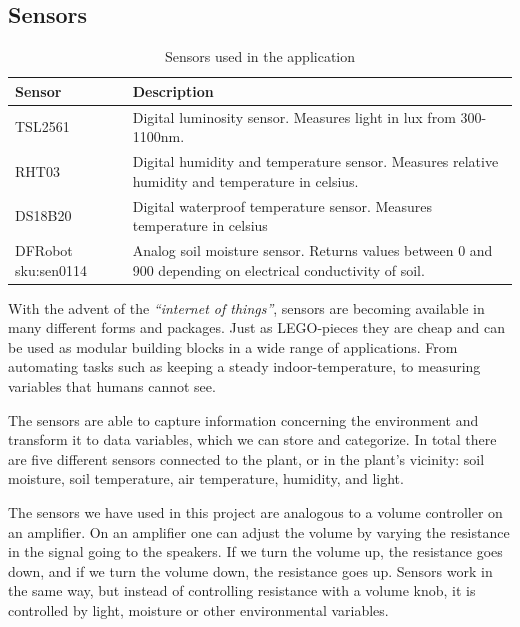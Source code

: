 \subsection{Sensors}

\def\arraystretch{1.8}
\begin{table}
    \begin{tabular}{@{}lp{250pt}@{}}\toprule
    Sensor               & Description \\ \midrule                                                                                                  
    TSL2561              & Digital luminosity sensor. Measures light in lux from 300-1100nm.                                            \\ 
    RHT03                & Digital humidity and temperature sensor. Measures relative humidity and temperature in celsius.              \\ 
    DS18B20              & Digital waterproof temperature sensor. Measures temperature in celsius                                       \\ 
    DFRobot sku:sen0114  & Analog soil moisture sensor. Returns values between 0 and 900 depending on electrical conductivity of soil.  \\ \bottomrule
    \end{tabular}
    \caption{Sensors used in the application}
\end{table}


With the advent of the \emph{“internet of things”}, sensors are becoming available in many different forms and packages. Just as LEGO-pieces they are cheap and can be used as modular building blocks in a wide range of applications. From automating tasks such as keeping a steady indoor-temperature, to measuring variables that humans cannot see. 

The sensors are able to capture information concerning the environment and transform it to data variables, which we can store and categorize. In total there are five different sensors connected to the plant, or in the plant’s vicinity: soil moisture, soil temperature, air temperature, humidity, and light. 



The sensors we have used in this project are analogous to a volume controller on an amplifier. On an amplifier one can adjust the volume by varying the resistance in the signal going to the speakers. If we turn the volume up, the resistance goes down, and if we turn the volume down, the resistance goes up. Sensors work in the same way, but instead of controlling resistance with a volume knob, it is controlled by light, moisture or other environmental variables. 

